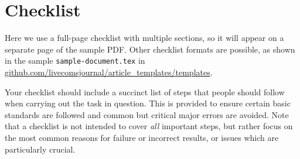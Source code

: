 \documentclass[9pt,bestpractices]{livecoms}
\begin{document}
\section{Checklist}
Here we use a full-page checklist with multiple sections, so it will appear on a separate page of the sample PDF.
Other checklist formats are possible, as shown in the sample \texttt{sample-document.tex} in \url{github.com/livecomsjournal/article_templates/templates}.

Your checklist should include a succinct list of steps that people should follow when carrying out the task in question.
This is provided to ensure certain basic standards are followed and common but critical major errors are avoided.
Note that a checklist is not intended to cover \emph{all} important steps, but rather focus on the most common reasons for failure or incorrect results, or issues which are particularly crucial.


\end{document}

